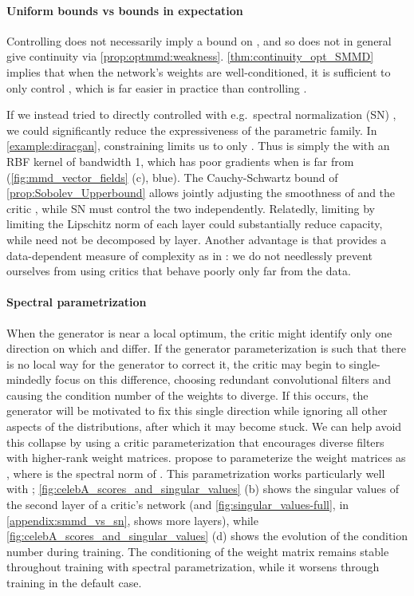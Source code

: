 \documentclass{article}
\let\citep\parencite
\begin{document}
\paragraph{Uniform bounds vs bounds in expectation}
Controlling 
does not necessarily imply a bound on ,
and so does not in general give continuity via \cref{prop:optmmd:weakness}.
\cref{thm:continuity_opt_SMMD} implies that when the network's weights are well-conditioned,
it is sufficient to only control ,
which is far easier in practice than controlling .


If we instead tried to directly controlled  with e.g.\ spectral normalization (SN) \citep{Miyato:2018},
we could significantly reduce the expressiveness of the parametric family.
In \cref{example:diracgan},
constraining  limits us to only .
Thus  is simply the  with an RBF kernel of bandwidth 1,
which has poor gradients when  is far from  (\cref{fig:mmd_vector_fields} (c), blue).
The Cauchy-Schwartz bound of \cref{prop:Sobolev_Upperbound}
allows jointly adjusting the smoothness of  and the critic ,
while SN must control the two independently.
Relatedly, limiting  by limiting the Lipschitz norm of each layer
could substantially reduce capacity,
while  need not be decomposed by layer.
Another advantage is that  provides a data-dependent measure of complexity as in \cite{Bousquet:2004}:
we do not needlessly prevent ourselves from using critics that behave poorly only far from the data.



\paragraph{Spectral parametrization}\label{par:parametrization}
When the generator is near a local optimum,
the critic might identify only one direction on which  and  differ.
If the generator parameterization is such that there is no local way for the generator to correct it,
the critic may begin to single-mindedly focus on this difference,
choosing redundant convolutional filters
and causing the condition number of the weights to diverge.
If this occurs, the generator will be motivated to fix this single direction
while ignoring all other aspects of the distributions,
after which it may become stuck.
We can help avoid this collapse by using a critic parameterization
that encourages diverse filters with higher-rank weight matrices.
\Textcite{Miyato:2018} propose to parameterize the weight matrices as
,
where  is the spectral norm of .
This parametrization works particularly well with ;
\cref{fig:celebA_scores_and_singular_values} (b) shows the singular values of the second layer of a critic's network (and \cref{fig:singular_values-full}, in \cref{appendix:smmd_vs_sn}, shows more layers), while \cref{fig:celebA_scores_and_singular_values} (d) shows the evolution of the condition number during training.
The conditioning of the weight matrix remains stable throughout training with spectral parametrization,
while it worsens through training in the default case.
\end{document}
